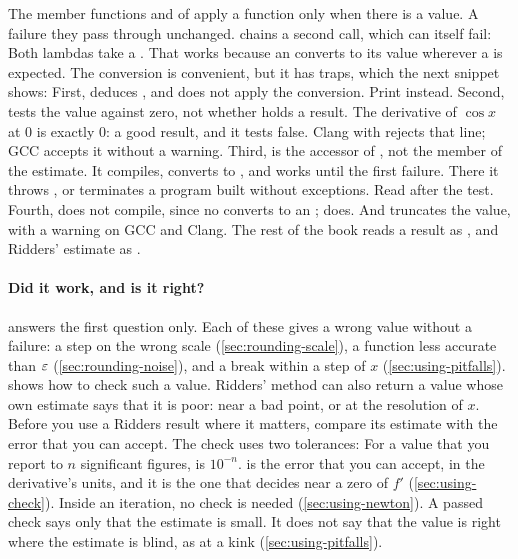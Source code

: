 The member functions  and  of  apply a function only when there is
a value. A failure they pass through unchanged.  chains a second call, which can itself fail:
Both lambdas take a . That works because an  converts to its value wherever a
 is expected. The conversion is convenient, but it has traps, which the next snippet shows:
First,  deduces , and  does not apply the conversion. Print
 instead. Second,  tests the value against zero, not whether  holds a result. The
derivative of $\cos x$ at 0 is exactly 0: a good result, and it tests false. Clang with 
rejects that line; GCC accepts it without a warning. Third,  is the accessor of ,
not the member of the estimate. It compiles, converts to , and works until the first failure. There it
throws , or terminates a program built without exceptions. Read  after
the test. Fourth,  does not compile, since no  converts to an
;  does. And  truncates the value, with a
 warning on GCC and Clang. The rest of the book reads a result as , and
Ridders' estimate as .

\paragraph{Did it work, and is it right?}  answers the first question only. Each of these gives a wrong
value without a failure: a step on the wrong scale (\cref{sec:rounding-scale}), a function less accurate than
$\varepsilon$ (\cref{sec:rounding-noise}), and a break within a step of $x$ (\cref{sec:using-pitfalls}).
 shows how to check such a value. Ridders' method can also return a value whose own estimate
says that it is poor: near a bad point, or at the resolution of $x$. Before you use a Ridders result where it
matters, compare its estimate with the error that you can accept. The check uses two tolerances:
For a value that you report to $n$ significant figures,  is $10^{-n}$.  is the error that you can accept, in the derivative's units, and it is the one
that decides near a zero of $f'$ (\cref{sec:using-check}). Inside an iteration, no check is needed
(\cref{sec:using-newton}). A passed check says only that the estimate is small. It does not say that the value is
right where the estimate is blind, as at a kink (\cref{sec:using-pitfalls}).

